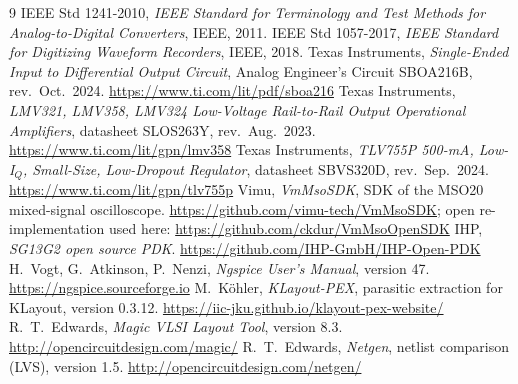 \begin{thebibliography}{9}
 IEEE Std 1241-2010, \emph{IEEE Standard for Terminology and Test Methods for
  Analog-to-Digital Converters}, IEEE, 2011.
 IEEE Std 1057-2017, \emph{IEEE Standard for Digitizing Waveform Recorders}, IEEE, 2018.
 Texas Instruments, \emph{Single-Ended Input to Differential Output Circuit},
  Analog Engineer's Circuit SBOA216B, rev.\ Oct.\ 2024. \url{https://www.ti.com/lit/pdf/sboa216}
 Texas Instruments, \emph{LMV321, LMV358, LMV324 Low-Voltage Rail-to-Rail Output
  Operational Amplifiers}, datasheet SLOS263Y, rev.\ Aug.\ 2023. \url{https://www.ti.com/lit/gpn/lmv358}
 Texas Instruments, \emph{TLV755P 500-mA, Low-I$_Q$, Small-Size, Low-Dropout
  Regulator}, datasheet SBVS320D, rev.\ Sep.\ 2024. \url{https://www.ti.com/lit/gpn/tlv755p}
 Vimu, \emph{VmMsoSDK}, SDK of the MSO20 mixed-signal oscilloscope.
  \url{https://github.com/vimu-tech/VmMsoSDK}; open re-implementation used here:
  \url{https://github.com/ckdur/VmMsoOpenSDK}
 IHP, \emph{SG13G2 open source PDK}. \url{https://github.com/IHP-GmbH/IHP-Open-PDK}
 H.~Vogt, G.~Atkinson, P.~Nenzi, \emph{Ngspice User's Manual}, version 47.
  \url{https://ngspice.sourceforge.io}
 M.~K\"ohler, \emph{KLayout-PEX}, parasitic extraction for KLayout, version 0.3.12.
  \url{https://iic-jku.github.io/klayout-pex-website/}
 R.~T.~Edwards, \emph{Magic VLSI Layout Tool}, version 8.3.
  \url{http://opencircuitdesign.com/magic/}
 R.~T.~Edwards, \emph{Netgen}, netlist comparison (LVS), version 1.5.
  \url{http://opencircuitdesign.com/netgen/}
\end{thebibliography}
